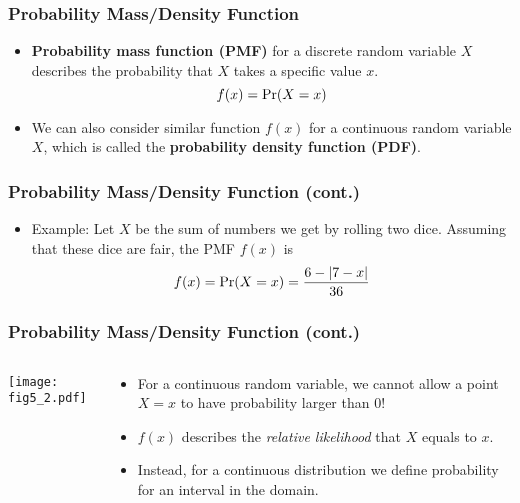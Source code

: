 \documentclass[pdflatex, 12pt]{beamer}
\begin{document}
\begin{frame}
\frametitle{Probability Mass/Density Function}
\begin{itemize}
\item \textbf{Probability mass function (PMF)} for a discrete random variable $X$ describes the probability that $X$ takes a specific value $x$.
 \begin{equation}
 f(x) = \Pr(X = x) \notag
 \end{equation}
\vspace{0.4cm}
\item We can also consider similar function $f(x)$ for a continuous random variable $X$, which is called the \textbf{probability density function (PDF)}.   
\end{itemize}
\end{frame}

\begin{frame}
\frametitle{Probability Mass/Density Function (cont.)}
\begin{itemize}
\item Example: Let $X$ be the sum of numbers we get by rolling two dice. Assuming that these dice are fair, the PMF $f(x)$ is
 \begin{equation}
 f(x) = \Pr(X = x) = \frac{6 - |7 - x|}{36} \notag
 \end{equation}
\end{itemize}
\end{frame}

\begin{frame}
\frametitle{Probability Mass/Density Function (cont.)}
\begin{columns}
\begin{column}{0.5\textwidth}
\texttt{[image: fig5\_2.pdf]}
\end{column}
\begin{column}{0.5\textwidth}
\begin{itemize}
\item For a continuous random variable, we cannot allow a point $X = x$ to have probability larger than 0!
\vspace{0.4cm}
\item $f(x)$ describes the \emph{relative likelihood} that $X$ equals to $x$.
\vspace{0.4cm}
\item Instead, for a continuous distribution we define probability for an interval in the domain.
\end{itemize}
\end{column}
\end{columns}
\end{frame}
\end{document}
